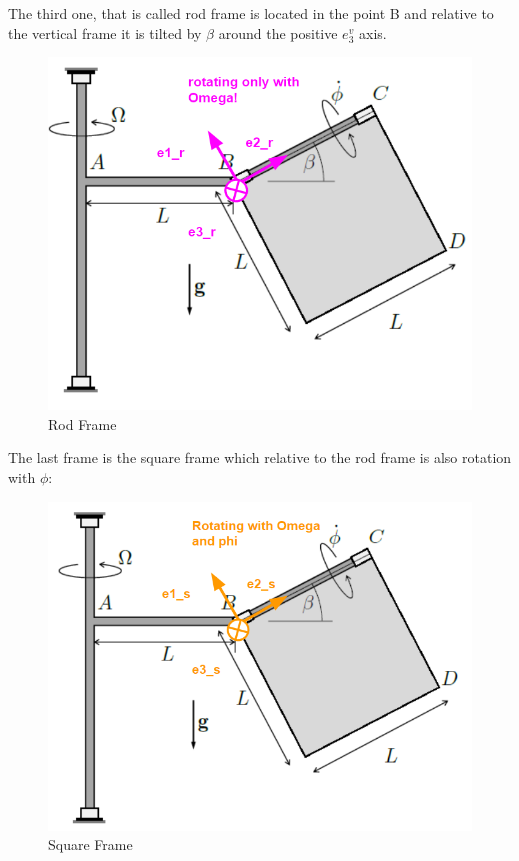 The third one, that is called rod frame is located in the point B and relative to the vertical frame it is tilted by $\beta$ around the positive $e_3^v$ axis.

\begin{figure}[ht]
    \centering
    \includegraphics[scale=0.5]{images/rod_frame.png}
    \caption{Rod Frame}
    \label{fig:rod_frame}
\end{figure}

The last frame is the square frame which relative to the rod frame is also rotation with $\phi$:

\begin{figure}[ht]
    \centering
    \includegraphics[scale=0.5]{images/square_frame.png}
    \caption{Square Frame}
    \label{fig:square_frame}
\end{figure}


